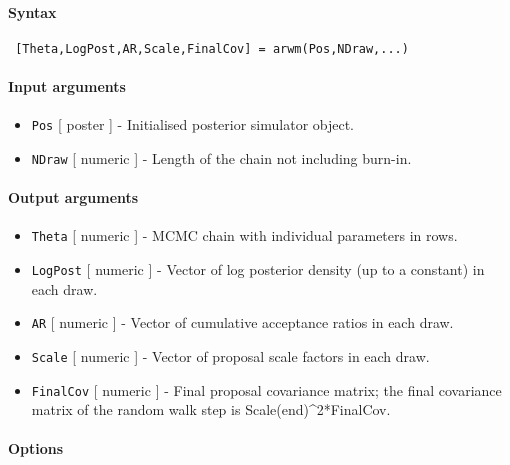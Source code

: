 


	\paragraph{Syntax}
 
 \begin{verbatim}
 [Theta,LogPost,AR,Scale,FinalCov] = arwm(Pos,NDraw,...)
 \end{verbatim}
 
 \paragraph{Input arguments}
 
 \begin{itemize}
 \item
   \texttt{Pos} {[} poster {]} - Initialised posterior simulator object.
 \item
   \texttt{NDraw} {[} numeric {]} - Length of the chain not including
   burn-in.
 \end{itemize}
 
 \paragraph{Output arguments}
 
 \begin{itemize}
 \item
   \texttt{Theta} {[} numeric {]} - MCMC chain with individual parameters
   in rows.
 \item
   \texttt{LogPost} {[} numeric {]} - Vector of log posterior density (up
   to a constant) in each draw.
 \item
   \texttt{AR} {[} numeric {]} - Vector of cumulative acceptance ratios
   in each draw.
 \item
   \texttt{Scale} {[} numeric {]} - Vector of proposal scale factors in
   each draw.
 \item
   \texttt{FinalCov} {[} numeric {]} - Final proposal covariance matrix;
   the final covariance matrix of the random walk step is
   Scale(end)\^{}2*FinalCov.
 \end{itemize}
 
 \paragraph{Options}
 
